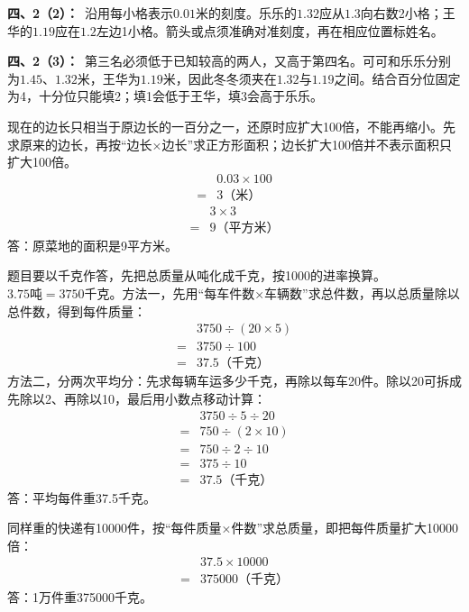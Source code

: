 \documentclass[multi=snippet,border=0pt]{standalone}
\newenvironment{snippet}[3]{\begin{minipage}{#1bp}\color{answerred}\fontsize{#2}{#3}\selectfont\raggedright}{\end{minipage}}
\begin{document}
\begin{snippet}{505}{11.5}{14}\textbf{四、2（2）：}\ 沿用每小格表示\(0.01\)米的刻度。乐乐的\(1.32\)应从\(1.3\)向右数2小格；王华的\(1.19\)应在\(1.2\)左边1小格。箭头或点须准确对准刻度，再在相应位置标姓名。\end{snippet}
\begin{snippet}{505}{11.5}{14}\textbf{四、2（3）：}\ 第三名必须低于已知较高的两人，又高于第四名。可可和乐乐分别为\(1.45\)、\(1.32\)米，王华为\(1.19\)米，因此冬冬须夹在\(1.32\)与\(1.19\)之间。结合百分位固定为4，十分位只能填2；填1会低于王华，填3会高于乐乐。\end{snippet}
\begin{snippet}{505}{11.5}{14}现在的边长只相当于原边长的一百分之一，还原时应扩大100倍，不能再缩小。先求原来的边长，再按“边长×边长”求正方形面积；边长扩大100倍并不表示面积只扩大100倍。\[\begin{aligned}&0.03\times100\\={}&3\text{（米）}\end{aligned}\]\[\begin{aligned}&3\times3\\={}&9\text{（平方米）}\end{aligned}\]答：原菜地的面积是9平方米。\end{snippet}
\begin{snippet}{505}{11.5}{14}题目要以千克作答，先把总质量从吨化成千克，按1000的进率换算。\(3.75\text{吨}=3750\text{千克}\)。方法一，先用“每车件数×车辆数”求总件数，再以总质量除以总件数，得到每件质量：\[\begin{aligned}&3750\div(20\times5)\\={}&3750\div100\\={}&37.5\text{（千克）}\end{aligned}\]方法二，分两次平均分：先求每辆车运多少千克，再除以每车20件。除以20可拆成先除以2、再除以10，最后用小数点移动计算：\[\begin{aligned}&3750\div5\div20\\={}&750\div(2\times10)\\={}&750\div2\div10\\={}&375\div10\\={}&37.5\text{（千克）}\end{aligned}\]答：平均每件重37.5千克。\par 同样重的快递有10000件，按“每件质量×件数”求总质量，即把每件质量扩大10000倍：\[\begin{aligned}&37.5\times10000\\={}&375000\text{（千克）}\end{aligned}\]答：1万件重375000千克。\end{snippet}
\end{document}
